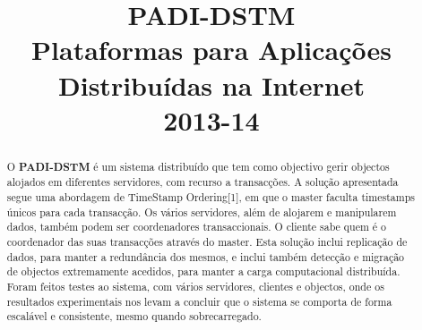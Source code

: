 \documentclass[times, 10pt,twocolumn]{article}
\begin{document}
\title{\huge{PADI-DSTM} \\[0,1in] \textmd{Plataformas para Aplicações Distribuídas na Internet \\[0,05in] 2013-14}}

\maketitle
\thispagestyle{empty}

\begin{abstract}

O \textbf{PADI-DSTM} é um sistema distribuído que tem como objectivo gerir objectos alojados em diferentes servidores, com recurso a transacções. A solução apresentada segue uma abordagem de TimeStamp Ordering[1], em que o master faculta timestamps únicos para cada transacção. Os vários servidores, além de alojarem e manipularem dados, também podem ser coordenadores transaccionais. O cliente sabe quem é o coordenador das suas transacções através do master. Esta solução inclui replicação de dados, para manter a redundância dos mesmos, e inclui também detecção e migração de objectos extremamente acedidos, para manter a carga computacional distribuída. Foram feitos testes ao sistema, com vários servidores, clientes e objectos, onde os resultados experimentais nos levam a concluir que o sistema se comporta de forma escalável e consistente, mesmo quando sobrecarregado. 

\end{abstract}









\nocite{ex1}


\end{document}
